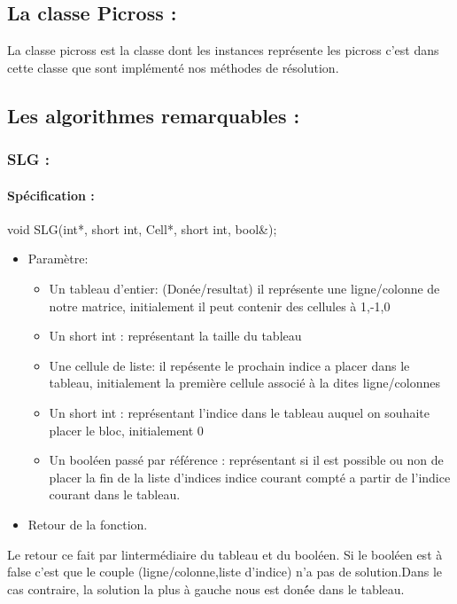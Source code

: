 \documentclass{article}
\begin{document}
\subsection{ La classe Picross :}
La classe picross est la classe dont les instances repr\'esente les picross c'est dans cette classe que sont impl\'ement\'e nos m\'ethodes de r\'esolution.
\subsection{Les algorithmes remarquables :}
\subsubsection{SLG :}
\paragraph{Sp\'ecification :}
 void SLG(int*, short int, Cell*, short int, bool\&);
\begin{itemize}
\item Param\`etre:
\begin{itemize}
\item Un tableau d'entier: (Donée/resultat) il repr\'esente une ligne/colonne de notre matrice, initialement il peut contenir des cellules \`a 1,-1,0
\item Un short int : repr\'esentant la taille du tableau
\item Une cellule de liste: il rep\'esente le prochain indice a placer dans le tableau, initialement la premi\`ere cellule associ\'e \`a la dites ligne/colonnes
\item Un short int : repr\'esentant l'indice dans le tableau auquel on souhaite placer le bloc, initialement 0
\item Un bool\'een passé par r\'ef\'erence : représentant si il est possible ou non de placer la fin de la liste d'indices indice courant compt\'e a partir de l'indice courant dans le tableau.
\end{itemize}
\item Retour de la fonction.
\end{itemize}
Le retour ce fait par linterm\'ediaire du tableau  et du bool\'een. Si le bool\'een est \`a false c'est que le couple (ligne/colonne,liste d'indice) n'a pas de solution.Dans le cas contraire, la solution la plus \`a gauche nous est don\'ée dans le tableau.
\end{document}
